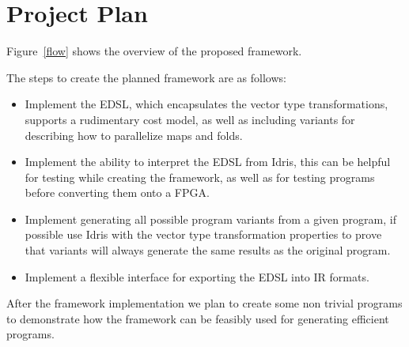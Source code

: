 \section{Project Plan}

Figure~\ref{flow} shows the overview of the proposed framework.

The steps to create the planned framework are as follows:
\begin{itemize}
\item Implement the EDSL, which encapsulates the vector type transformations, supports
      a rudimentary cost model, as well as including variants for describing how to parallelize
      maps and folds. 

\item Implement the ability to interpret the EDSL from Idris, this can
      be helpful for testing while creating the framework, as well as for
      testing programs before converting them onto a FPGA.

\item Implement generating all possible program variants from a given program,
      if possible use Idris with the vector type transformation properties to prove
      that variants will always generate the same results as the original program.

\item Implement a flexible interface for exporting the EDSL into IR formats.
\end{itemize}

After the framework implementation we plan to create some non trivial programs 
to demonstrate how the framework can be feasibly used for generating efficient programs. 
